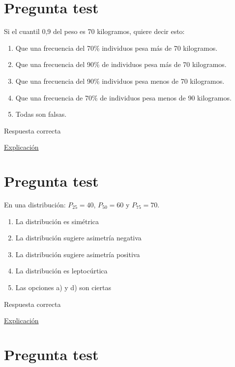 \documentclass[
]{book}
\providecommand{\tightlist}{%
  \setlength{\itemsep}{0pt}\setlength{\parskip}{0pt}}
\begin{document}
\hypertarget{pregunta-test-62}{%
\section{Pregunta test}\label{pregunta-test-62}}

Si el cuantil 0,9 del peso es 70 kilogramos, quiere decir esto:

\begin{enumerate}
\def\labelenumi{\alph{enumi})}
\tightlist
\item
  Que una frecuencia del 70\% individuos pesa más de 70 kilogramos.
\item
  Que una frecuencia del 90\% de individuos pesa más de 70 kilogramos.
\item
  Que una frecuencia del 90\% individuos pesa menos de 70 kilogramos.
\item
  Que una frecuencia de 70\% de individuos pesa menos de 90 kilogramos.
\item
  Todas son falsas.
\end{enumerate}

Respuesta correcta

\href{https://1fjmanzano.github.io/bioestadistica/medidas-de-posicio\%CC\%81n-dispersio\%CC\%81n-y-forma.html\#medidas-de-posicio\%CC\%81n-centrales}{Explicación}

\hypertarget{pregunta-test-63}{%
\section{Pregunta test}\label{pregunta-test-63}}

En una distribución: \(P_{25} = 40\), \(P_{50} =60\) y \(P_{75} =70\).

\begin{enumerate}
\def\labelenumi{\alph{enumi})}
\tightlist
\item
  La distribución es simétrica
\item
  La distribución sugiere asimetría negativa
\item
  La distribución sugiere asimetría positiva
\item
  La distribución es leptocúrtica
\item
  Las opciones a) y d) son ciertas
\end{enumerate}

Respuesta correcta

\href{https://1fjmanzano.github.io/bioestadistica/medidas-de-forma.html}{Explicación}

\hypertarget{pregunta-test-64}{%
\section{Pregunta test}\label{pregunta-test-64}}
\end{document}
